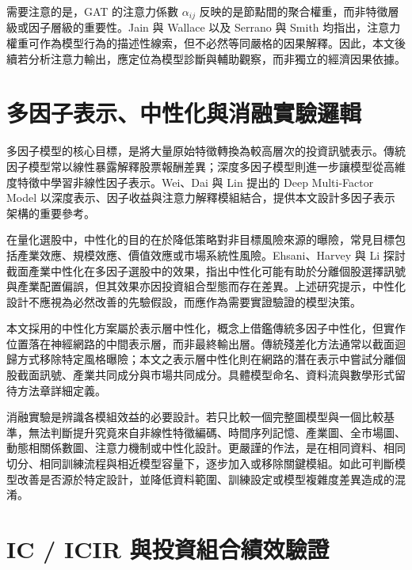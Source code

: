 需要注意的是，GAT 的注意力係數 \(\alpha_{ij}\) 反映的是節點間的聚合權重，而非特徵層級或因子層級的重要性。Jain 與 Wallace \cite{jain2019attention_not_explanation} 以及 Serrano 與 Smith \cite{serrano2019attention_interpretable} 均指出，注意力權重可作為模型行為的描述性線索，但不必然等同嚴格的因果解釋。因此，本文後續若分析注意力輸出，應定位為模型診斷與輔助觀察，而非獨立的經濟因果依據。

\section{多因子表示、中性化與消融實驗邏輯}
\label{sec:multifactor_neutralization_ablation_logic}

多因子模型的核心目標，是將大量原始特徵轉換為較高層次的投資訊號表示。傳統因子模型常以線性暴露解釋股票報酬差異；深度多因子模型則進一步讓模型從高維度特徵中學習非線性因子表示。Wei、Dai 與 Lin \cite{wei2022factor} 提出的 Deep Multi-Factor Model 以深度表示、因子收益與注意力解釋模組結合，提供本文設計多因子表示架構的重要參考。

在量化選股中，中性化的目的在於降低策略對非目標風險來源的曝險，常見目標包括產業效應、規模效應、價值效應或市場系統性風險。Ehsani、Harvey 與 Li \cite{ehsani2023sector_neutrality} 探討截面產業中性化在多因子選股中的效果，指出中性化可能有助於分離個股選擇訊號與產業配置偏誤，但其效果亦因投資組合型態而存在差異。上述研究提示，中性化設計不應視為必然改善的先驗假設，而應作為需要實證驗證的模型決策。

本文採用的中性化方案屬於表示層中性化，概念上借鑑傳統多因子中性化，但實作位置落在神經網路的中間表示層，而非最終輸出層。傳統殘差化方法通常以截面迴歸方式移除特定風格曝險；本文之表示層中性化則在網路的潛在表示中嘗試分離個股截面訊號、產業共同成分與市場共同成分。具體模型命名、資料流與數學形式留待方法章詳細定義。

消融實驗是辨識各模組效益的必要設計。若只比較一個完整圖模型與一個比較基準，無法判斷提升究竟來自非線性特徵編碼、時間序列記憶、產業圖、全市場圖、動態相關係數圖、注意力機制或中性化設計。更嚴謹的作法，是在相同資料、相同切分、相同訓練流程與相近模型容量下，逐步加入或移除關鍵模組。如此可判斷模型改善是否源於特定設計，並降低資料範圍、訓練設定或模型複雜度差異造成的混淆。

\section{IC / ICIR 與投資組合績效驗證}
\label{sec:ic_icir_portfolio_validation}

